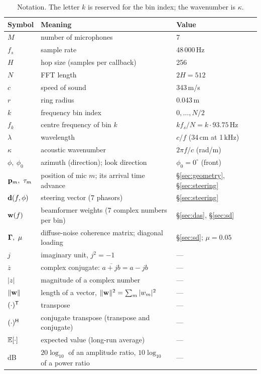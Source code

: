\documentclass[11pt]{article}
\begin{document}
\begin{table}[ht]
\centering\small
\begin{tabular}{@{}lll@{}}
\toprule
Symbol & Meaning & Value\\
\midrule
$M$ & number of microphones & 7\\
$f_s$ & sample rate & 48\,000\,Hz\\
$H$ & hop size (samples per callback) & 256\\
$N$ & FFT length & $2H=512$\\
$c$ & speed of sound & 343\,m/s\\
$r$ & ring radius & 0.043\,m\\
$k$ & frequency bin index & $0,\dots,N/2$\\
$f_k$ & centre frequency of bin $k$ & $k f_s/N = k\cdot 93.75$\,Hz\\
$\lambda$ & wavelength & $c/f$ (34\,cm at 1\,kHz)\\
$\kappa$ & acoustic wavenumber & $2\pi f/c$ (rad/m)\\
$\phi,\ \phi_0$ & azimuth (direction); look direction & $\phi_0=0^\circ$ (front)\\
$\vp_m,\ \tau_m$ & position of mic $m$; its arrival time advance & \S\ref{sec:geometry}, \S\ref{sec:steering}\\
$\mathbf{d}(f,\phi)$ & steering vector (7 phasors) & \S\ref{sec:steering}\\
$\mathbf{w}(f)$ & beamformer weights (7 complex numbers per bin) & \S\ref{sec:das}, \S\ref{sec:sd}\\
$\G,\ \mu$ & diffuse-noise coherence matrix; diagonal loading & \S\ref{sec:sd}; $\mu=0.05$\\
\midrule
$j$ & imaginary unit, $j^2=-1$ & ---\\
$\overline{z}$ & complex conjugate: $\overline{a+jb}=a-jb$ & ---\\
$|z|$ & magnitude of a complex number & ---\\
$\|\mathbf{w}\|$ & length of a vector, $\|\mathbf{w}\|^2=\sum_m|w_m|^2$ & ---\\
$(\cdot)^{\mathsf T}$ & transpose & ---\\
$(\cdot)^{\mathsf H}$ & conjugate transpose (transpose and conjugate) & ---\\
$\mathbb{E}[\cdot]$ & expected value (long-run average) & ---\\
dB & $20\log_{10}$ of an amplitude ratio, $10\log_{10}$ of a power ratio & ---\\
\bottomrule
\end{tabular}
\caption{Notation. The letter $k$ is reserved for the bin index; the wavenumber is $\kappa$.}
\label{tab:notation}
\end{table}
\end{document}
